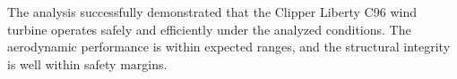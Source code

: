 \documentclass[11pt]{article}
\begin{document}
The analysis successfully demonstrated that the Clipper Liberty C96 wind turbine operates safely and efficiently under the analyzed conditions. The aerodynamic performance is within expected ranges, and the structural integrity is well within safety margins.

\newpage
\nocite{*}


\end{document}
